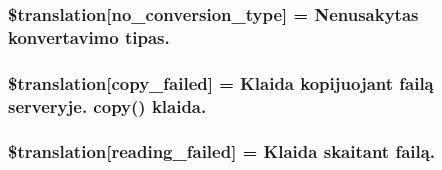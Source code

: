 \subsubsection[{\$translation}]{\setlength{\rightskip}{0pt plus 5cm}\$translation\mbox{[}\textquotesingle{}no\+\_\+conversion\+\_\+type\textquotesingle{}\mbox{]} = \textquotesingle{}Nenusakytas konvertavimo tipas.\textquotesingle{}}\label{class_8upload_8lt___l_t_8php_a4712d7ec28e9a7f17eb3338af2358363}
\hypertarget{class_8upload_8lt___l_t_8php_a783c9358bcf54a054545b50098bc679b}{}
\subsubsection[{\$translation}]{\setlength{\rightskip}{0pt plus 5cm}\$translation\mbox{[}\textquotesingle{}copy\+\_\+failed\textquotesingle{}\mbox{]} = \textquotesingle{}Klaida kopijuojant failą serveryje. copy() klaida.\textquotesingle{}}\label{class_8upload_8lt___l_t_8php_a783c9358bcf54a054545b50098bc679b}
\hypertarget{class_8upload_8lt___l_t_8php_a01bea14c9fd5f353f62db44beabfcd42}{}
\subsubsection[{\$translation}]{\setlength{\rightskip}{0pt plus 5cm}\$translation\mbox{[}\textquotesingle{}reading\+\_\+failed\textquotesingle{}\mbox{]} = \textquotesingle{}Klaida skaitant failą.\textquotesingle{}}\label{class_8upload_8lt___l_t_8php_a01bea14c9fd5f353f62db44beabfcd42}

